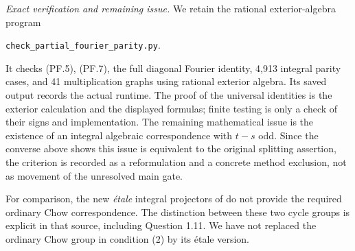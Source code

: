 \emph{Exact verification and remaining issue.}
We retain the rational exterior-algebra program
\begin{center}
\texttt{check\_partial\_fourier\_parity.py}.
\end{center}
It checks (PF.5), (PF.7), the full diagonal Fourier identity,
4,913 integral parity cases, and 41 multiplication graphs using
rational exterior algebra. Its saved output records the actual
runtime. The proof of the universal identities is the exterior
calculation and the displayed formulas; finite testing is only
a check of their signs and implementation.
The remaining mathematical issue is the existence of an
integral algebraic correspondence with $t-s$ odd. Since the
converse above shows this issue is equivalent to the original
splitting assertion, the criterion is recorded as a
reformulation and a concrete method exclusion, not as movement
of the unresolved main gate.

For comparison, the new \emph{\'etale} integral projectors of
\citet[Theorem 1.7, Corollary 1.8, and \S B.6]{cyKahnDivided2026PF}
do not provide the required ordinary Chow correspondence.
The distinction between these two cycle groups is explicit
in that source, including Question 1.11. We have not replaced
the ordinary Chow group in condition (2) by its \'etale version.
